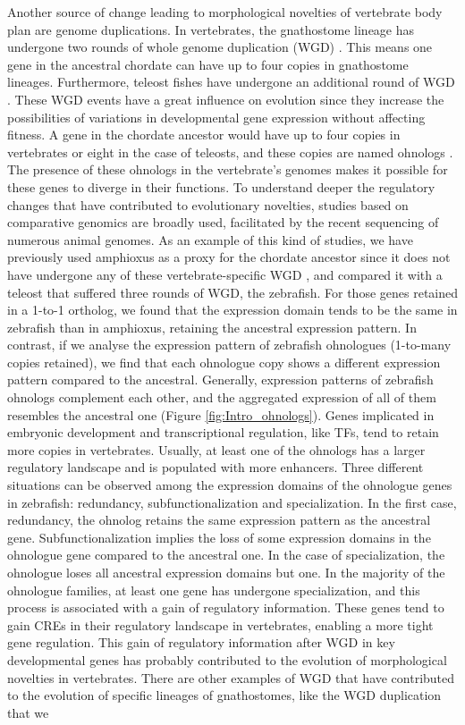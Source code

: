 Another source of change leading to morphological novelties of vertebrate body plan are genome duplications. In vertebrates, the gnathostome lineage has undergone two rounds of whole genome duplication (WGD) \parencite{dehal_two_2005, putnam_amphioxus_2008}. This means one gene in the ancestral chordate can have up to four copies in gnathostome lineages. Furthermore, teleost fishes have undergone an additional round of WGD \parencite{taylor_genome_2003, braasch_spotted_2016, simakov_deeply_2020}. These WGD events have a great influence on evolution since they increase the possibilities of variations in developmental gene expression without affecting fitness. A gene in the chordate ancestor would have up to four copies in vertebrates or eight in the case of teleosts, and these copies are named ohnologs \parencite{ohno_evolution_1970}. The presence of these ohnologs in the vertebrate's genomes makes it possible for these genes to diverge in their functions. To understand deeper the regulatory changes that have contributed to evolutionary novelties, studies based on comparative genomics are broadly used, facilitated by the recent sequencing of numerous animal genomes. As an example of this kind of studies, we have previously used amphioxus as a proxy for the chordate ancestor since it does not have undergone any of these vertebrate-specific WGD \parencite{marletaz_amphioxus_2018}, and compared it with a teleost that suffered three rounds of WGD, the zebrafish. For those genes retained in a 1-to-1 ortholog, we found that the expression domain tends to be the same in zebrafish than in amphioxus, retaining the ancestral expression pattern. In contrast, if we analyse the expression pattern of zebrafish ohnologues (1-to-many copies retained), we find that each ohnologue copy shows a different expression pattern compared to the ancestral. Generally, expression patterns of zebrafish ohnologs complement each other, and the aggregated expression of all of them resembles the ancestral one (Figure \ref{fig:Intro_ohnologs}). Genes implicated in embryonic development and transcriptional regulation, like TFs, tend to retain more copies in vertebrates. Usually, at least one of the ohnologs has a larger regulatory landscape and is populated with more enhancers. Three different situations can be observed among the expression domains of the ohnologue genes in zebrafish: redundancy, subfunctionalization and specialization. In the first case, redundancy, the ohnolog retains the same expression pattern as the ancestral gene. Subfunctionalization implies the loss of some expression domains in the ohnologue gene compared to the ancestral one. In the case of specialization, the ohnologue loses all ancestral expression domains but one. In the majority of the ohnologue families, at least one gene has undergone specialization, and this process is associated with a gain of regulatory information. These genes tend to gain CREs in their regulatory landscape in vertebrates, enabling a more tight gene regulation. This gain of regulatory information after WGD in key developmental genes has probably contributed to the evolution of morphological novelties in vertebrates. There are other examples of WGD that have contributed to the evolution of specific lineages of gnathostomes, like the WGD duplication that we 